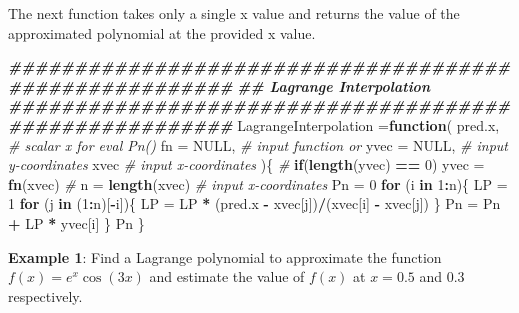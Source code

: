 \documentclass[
]{book}
\newenvironment{Shaded}{\begin{snugshade}}{\end{snugshade}}
\newcommand{\AttributeTok}[1]{\textcolor[rgb]{0.13,0.29,0.53}{#1}}
\newcommand{\CommentTok}[1]{\textcolor[rgb]{0.56,0.35,0.01}{\textit{#1}}}
\newcommand{\ConstantTok}[1]{\textcolor[rgb]{0.56,0.35,0.01}{#1}}
\newcommand{\ControlFlowTok}[1]{\textcolor[rgb]{0.13,0.29,0.53}{\textbf{#1}}}
\newcommand{\DecValTok}[1]{\textcolor[rgb]{0.00,0.00,0.81}{#1}}
\newcommand{\DocumentationTok}[1]{\textcolor[rgb]{0.56,0.35,0.01}{\textbf{\textit{#1}}}}
\newcommand{\FunctionTok}[1]{\textcolor[rgb]{0.13,0.29,0.53}{\textbf{#1}}}
\newcommand{\NormalTok}[1]{#1}
\newcommand{\OtherTok}[1]{\textcolor[rgb]{0.56,0.35,0.01}{#1}}
\newcommand{\SpecialCharTok}[1]{\textcolor[rgb]{0.81,0.36,0.00}{\textbf{#1}}}
\begin{document}
The next function takes only a single x value and returns the value of the approximated polynomial at the provided x value.

\begin{Shaded}
\begin{Highlighting}[]
\DocumentationTok{\#\#\#\#\#\#\#\#\#\#\#\#\#\#\#\#\#\#\#\#\#\#\#\#\#\#\#\#\#\#\#\#\#\#\#\#\#\#\#\#\#\#\#\#\#\#\#\#\#\#\#\#\#\#\#}
\DocumentationTok{\#\#        Lagrange Interpolation}
\DocumentationTok{\#\#\#\#\#\#\#\#\#\#\#\#\#\#\#\#\#\#\#\#\#\#\#\#\#\#\#\#\#\#\#\#\#\#\#\#\#\#\#\#\#\#\#\#\#\#\#\#\#\#\#\#\#\#\#}
\NormalTok{LagrangeInterpolation }\OtherTok{=}\ControlFlowTok{function}\NormalTok{(}
\NormalTok{                        pred.x,      }\CommentTok{\# scalar x for eval Pn() }
                        \AttributeTok{fn =} \ConstantTok{NULL}\NormalTok{,   }\CommentTok{\# input function or}
                        \AttributeTok{yvec =} \ConstantTok{NULL}\NormalTok{, }\CommentTok{\# input y{-}coordinates}
\NormalTok{                        xvec         }\CommentTok{\# input x{-}coordinates}
\NormalTok{                        )\{}
     \CommentTok{\# }
     \ControlFlowTok{if}\NormalTok{(}\FunctionTok{length}\NormalTok{(yvec) }\SpecialCharTok{==} \DecValTok{0}\NormalTok{) yvec }\OtherTok{=} \FunctionTok{fn}\NormalTok{(xvec) }\CommentTok{\#}
\NormalTok{     n }\OtherTok{=} \FunctionTok{length}\NormalTok{(xvec)       }\CommentTok{\# input x{-}coordinates}
\NormalTok{     Pn }\OtherTok{=} \DecValTok{0}
     \ControlFlowTok{for}\NormalTok{ (i }\ControlFlowTok{in} \DecValTok{1}\SpecialCharTok{:}\NormalTok{n)\{}
\NormalTok{         LP }\OtherTok{=} \DecValTok{1}
         \ControlFlowTok{for}\NormalTok{ (j }\ControlFlowTok{in}\NormalTok{ (}\DecValTok{1}\SpecialCharTok{:}\NormalTok{n)[}\SpecialCharTok{{-}}\NormalTok{i])\{  }
\NormalTok{              LP }\OtherTok{=}\NormalTok{ LP }\SpecialCharTok{*}\NormalTok{ (pred.x }\SpecialCharTok{{-}}\NormalTok{ xvec[j])}\SpecialCharTok{/}\NormalTok{(xvec[i] }\SpecialCharTok{{-}}\NormalTok{ xvec[j])}
\NormalTok{             \}}
\NormalTok{         Pn }\OtherTok{=}\NormalTok{ Pn }\SpecialCharTok{+}\NormalTok{ LP }\SpecialCharTok{*}\NormalTok{ yvec[i]}
\NormalTok{       \}}
\NormalTok{   Pn}
\NormalTok{  \}}
\end{Highlighting}
\end{Shaded}

\hfill\break

\textbf{Example 1}: Find a Lagrange polynomial to approximate the function \(f(x) = e^x\cos(3x)\) and estimate the value of \(f(x)\) at \(x = 0.5\) and \(0.3\) respectively.
\end{document}
